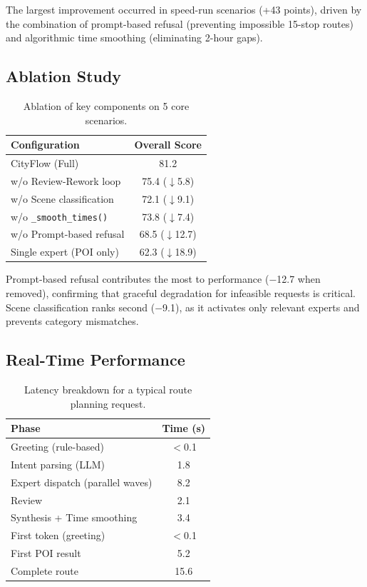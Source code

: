 \documentclass[11pt]{article}
\begin{document}
The largest improvement occurred in speed-run scenarios (+43 points), driven by the combination of prompt-based refusal (preventing impossible 15-stop routes) and algorithmic time smoothing (eliminating 2-hour gaps).

\subsection{Ablation Study}

\begin{table}[h]
\centering
\caption{Ablation of key components on 5 core scenarios.}
\label{tab:ablation}
\begin{tabular}{@{}lc@{}}
\toprule
\textbf{Configuration} & \textbf{Overall Score} \\
\midrule
CityFlow (Full) & 81.2 \\
w/o Review-Rework loop & 75.4 ($\downarrow$5.8) \\
w/o Scene classification & 72.1 ($\downarrow$9.1) \\
w/o \texttt{\_smooth\_times()} & 73.8 ($\downarrow$7.4) \\
w/o Prompt-based refusal & 68.5 ($\downarrow$12.7) \\
Single expert (POI only) & 62.3 ($\downarrow$18.9) \\
\bottomrule
\end{tabular}
\end{table}

Prompt-based refusal contributes the most to performance ($-$12.7 when removed), confirming that graceful degradation for infeasible requests is critical. Scene classification ranks second ($-$9.1), as it activates only relevant experts and prevents category mismatches.

\subsection{Real-Time Performance}

\begin{table}[h]
\centering
\caption{Latency breakdown for a typical route planning request.}
\label{tab:latency}
\begin{tabular}{@{}lc@{}}
\toprule
\textbf{Phase} & \textbf{Time (s)} \\
\midrule
Greeting (rule-based) & $<$0.1 \\
Intent parsing (LLM) & 1.8 \\
Expert dispatch (parallel waves) & 8.2 \\
Review & 2.1 \\
Synthesis + Time smoothing & 3.4 \\
\midrule
First token (greeting) & $<$0.1 \\
First POI result & 5.2 \\
Complete route & 15.6 \\
\bottomrule
\end{tabular}
\end{table}
\end{document}
